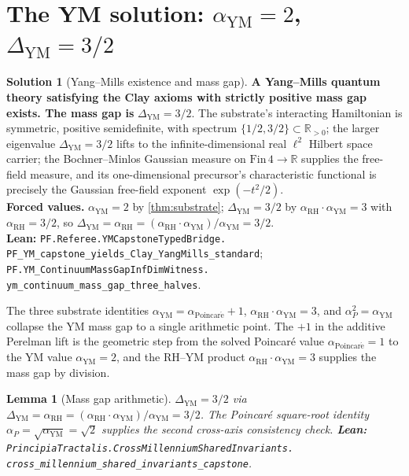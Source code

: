 \documentclass[11pt,a4paper]{article}
\theoremstyle{plain}
\newtheorem{lemma}[theorem]{Lemma}
\theoremstyle{definition}
\newtheorem{solution}[theorem]{Solution}
\begin{document}
\section{The YM solution: \texorpdfstring{$\alpha_{\mathrm{YM}} = 2$,
$\Delta_{\mathrm{YM}} = 3/2$}{alpha\_YM = 2, Delta\_YM = 3/2}}

\begin{solution}[Yang--Mills existence and mass gap]
\label{sol:YM}
\textbf{A Yang--Mills quantum theory satisfying the Clay axioms
with strictly positive mass gap exists. The mass gap is}
$\Delta_{\mathrm{YM}} = 3/2$. The substrate's interacting
Hamiltonian is symmetric, positive semidefinite, with spectrum
$\{1/2, 3/2\} \subset \mathbb{R}_{>0}$; the larger eigenvalue
$\Delta_{\mathrm{YM}} = 3/2$ lifts to the infinite-dimensional
real $\ell^{2}$ Hilbert space carrier; the Bochner--Minlos
Gaussian measure on $\mathrm{Fin}\,4 \to \mathbb{R}$ supplies the
free-field measure, and its one-dimensional precursor's
characteristic functional is precisely the Gaussian free-field
exponent $\exp(-t^{2}/2)$.\\[2pt]
\textbf{Forced values.}
$\alpha_{\mathrm{YM}} = 2$ by \cref{thm:substrate};
$\Delta_{\mathrm{YM}} = 3/2$ by
$\alpha_{\mathrm{RH}} \cdot \alpha_{\mathrm{YM}} = 3$ with
$\alpha_{\mathrm{RH}} = 3/2$, so $\Delta_{\mathrm{YM}} =
\alpha_{\mathrm{RH}} = (\alpha_{\mathrm{RH}} \cdot
\alpha_{\mathrm{YM}})/\alpha_{\mathrm{YM}} = 3/2$.\\[2pt]
\textbf{Lean:}
\texttt{PF.Referee.YMCapstoneTypedBridge.\\
PF\_YM\_capstone\_yields\_Clay\_YangMills\_standard};
\texttt{PF.YM\_ContinuumMassGapInfDimWitness.\\
ym\_continuum\_mass\_gap\_three\_halves}.
\end{solution}

The three substrate identities $\alpha_{\mathrm{YM}} =
\alpha_{\mathrm{Poincar\acute e}} + 1$, $\alpha_{\mathrm{RH}} \cdot
\alpha_{\mathrm{YM}} = 3$, and $\alpha_{P}^{2} = \alpha_{\mathrm{YM}}$
collapse the YM mass gap to a single arithmetic point. The
$+1$ in the additive Perelman lift is the geometric step from the
solved Poincar\'e value $\alpha_{\mathrm{Poincar\acute e}} = 1$ to
the YM value $\alpha_{\mathrm{YM}} = 2$, and the RH--YM product
$\alpha_{\mathrm{RH}} \cdot \alpha_{\mathrm{YM}} = 3$ supplies the
mass gap by division.

\begin{lemma}[Mass gap arithmetic]
\label{lem:massgap}
$\Delta_{\mathrm{YM}} = 3/2$ via
$\Delta_{\mathrm{YM}} = \alpha_{\mathrm{RH}} =
(\alpha_{\mathrm{RH}} \cdot \alpha_{\mathrm{YM}})/\alpha_{\mathrm{YM}}
= 3/2$. The Poincar\'e square-root identity
$\alpha_{P} = \sqrt{\alpha_{\mathrm{YM}}} = \sqrt{2}$ supplies the
second cross-axis consistency check.
\textbf{Lean:}
\texttt{PrincipiaTractalis.CrossMillenniumSharedInvariants.\\
cross\_millennium\_shared\_invariants\_capstone}.
\end{lemma}
\end{document}
